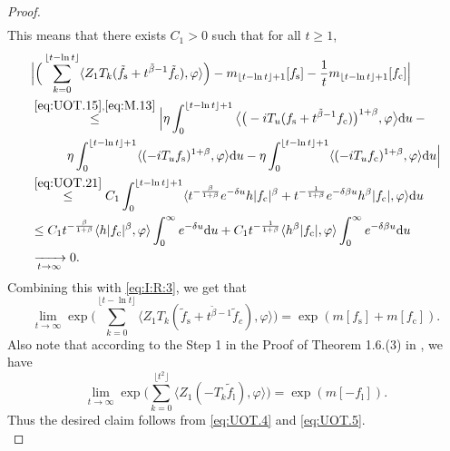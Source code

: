 \documentclass[12pt,a4paper]{amsart}
\theoremstyle{plain}
\theoremstyle{definition}
\numberwithin{equation}{section}
\begin{document}
\begin{proof}
\begin{align}
\end{align}
This means that there exists $C_1 >0$ such that for all $t\geq 1$,
\begin{align}
&\Big|\Big(\sum_{k=0}^{\lfloor t-\ln t \rfloor} \langle Z_1T_{k}(\tilde f_\mathrm s+t^{\tilde{\beta}-1}\tilde{f}_c), \varphi\rangle \Big)-m_{\lfloor t-\ln t \rfloor+1}[f_\mathrm s]-\frac{1}{t}m_{\lfloor t-\ln t \rfloor+1}[f_\mathrm c]\Big|
%
\\& \begin{multlined} 
\overset{\eqref{eq:UOT.15},\eqref{eq:M.13}}\leq\Big| \eta \int_0^{\lfloor t-\ln t \rfloor+1}\big\langle \big(-iT_u(f_\mathrm s+t^{\tilde{\beta}-1}f_\mathrm c)\big)^{1+\beta},\varphi \big\rangle \mathrm du - {}
\\ \eta \int_0^{\lfloor t-\ln t \rfloor+1} \langle (-iT_u f_\mathrm s)^{1+\beta}, \varphi \rangle  \mathrm du - \eta \int_0^{\lfloor t-\ln t \rfloor+1} \langle (-iT_u f_\mathrm c)^{1+\beta}, \varphi \rangle  \mathrm du\Big|
\end{multlined}
\\ & \overset{\eqref{eq:UOT.21}}\leq C_1\int_0^{\lfloor t-\ln t \rfloor+1}\langle t^{-\frac{\beta}{1+\beta}}e^{-\delta u}h|f_\mathrm c|^{\beta}+t^{-\frac{1}{1+\beta}}e^{-\delta\beta u}h^{\beta}|f_\mathrm c|, \varphi \rangle \mathrm du 
\\& \leq C_1 t^{-\frac{\beta}{1+\beta}} \langle h|f_\mathrm c|^{\beta},\varphi \rangle \int_0^\infty e^{-\delta u} \mathrm du + C_1 t^{-\frac{1}{1+\beta}} \langle h^\beta|f_\mathrm c|,\varphi \rangle \int_0^\infty e^{-\delta \beta u} \mathrm du
\\& \xrightarrow[t\rightarrow \infty]{} 0.
\end{align}
Combining this with \eqref{eq:I:R:3}, we get that
\begin{equation} \label{eq:UOT.4}
\lim_{t\rightarrow \infty}\exp\Big(\sum_{k=0}^{\lfloor t-\ln t \rfloor} \langle Z_1T_{k}(\tilde f_\mathrm s+t^{\tilde{\beta}-1}\tilde{f}_c), \varphi\rangle \Big)  = \exp( m[f_\mathrm s]+m[f_\mathrm c]).
\end{equation}
%
Also note that according to the Step 1 in the Proof of Theorem 1.6.(3) in \cite{RenSongSunZhao2019Stable}, we have
\begin{equation}\label{eq:UOT.5}
\lim_{t\rightarrow \infty}\exp\Big(\sum_{k=0}^{\lfloor t^2 \rfloor}\langle Z_1(-T_k\tilde{f}_\mathrm l),\varphi\rangle\Big) =\exp(m[-f_\mathrm l]).
\end{equation}
Thus the desired claim follows from \eqref{eq:UOT.4} and \eqref{eq:UOT.5}.
%
\\

\end{proof}
\end{document}

